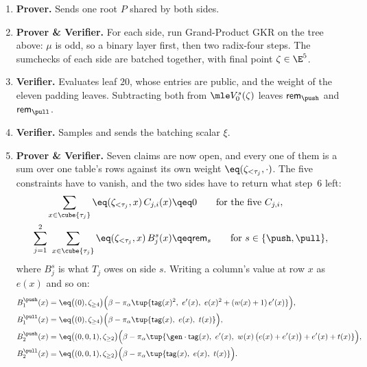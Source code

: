 \begin{enumerate}[itemsep=1pt,topsep=3pt]
\item \textbf{Prover.} Sends one root $P$ shared by both sides.
\item \textbf{Prover \& Verifier.} For each side, run Grand-Product GKR on the tree above: $\mu$ is odd, so a binary layer first, then two radix-four steps. The sumchecks of each side are batched together, with final point $\zeta\in\E^{5}$.
\item \textbf{Verifier.} Evaluates leaf $20$, whose entries are public, and the weight of the eleven padding leaves. Subtracting both from $\mle V^{s}_0(\zeta)$ leaves $\mathsf{rem}_{\push}$ and $\mathsf{rem}_{\pull}$.
\item \textbf{Verifier.} Samples and sends the batching scalar $\xi$.
\item \textbf{Prover \& Verifier.} Seven claims are now open, and every one of them is a sum over one table's rows against its own weight $\eq(\zeta_{<\tau_j},\cdot)$. The five constraints have to vanish, and the two sides have to return what step~6 left:
\begin{align*}
  \sum_{x\in\cube{\tau_j}}\eq(\zeta_{<\tau_j},x)\,C_{j,i}(x)&\qeq0 \qquad\text{for the five } C_{j,i},\\
  \sum_{j=1}^{2}\ \sum_{x\in\cube{\tau_j}}\eq(\zeta_{<\tau_j},x)\,B^{s}_{j}(x)&\qeq\mathsf{rem}_{s} \qquad\text{for } s\in\{\push,\pull\},
\end{align*}
where $B^{s}_{j}$ is what $T_j$ owes on side $s$. Writing a column's value at row $x$ as $e(x)$ and so on:
\begin{align*}
  B^{\push}_{1}(x)&=\eq\bigl((0),\zeta_{\ge4}\bigr)\Bigl(\beta-\pi_\alpha\tup{\mathsf{tag}(x)^{2},\ e'(x),\ e(x)^{2}+(w(x)+1)\,e'(x)}\Bigr),\\
  B^{\pull}_{1}(x)&=\eq\bigl((0),\zeta_{\ge4}\bigr)\Bigl(\beta-\pi_\alpha\tup{\mathsf{tag}(x),\ e(x),\ t(x)}\Bigr),\\
  B^{\push}_{2}(x)&=\eq\bigl((0,0,1),\zeta_{\ge2}\bigr)\Bigl(\beta-\pi_\alpha\tup{\gen\cdot\mathsf{tag}(x),\ e'(x),\ w(x)\,\bigl(e(x)+e'(x)\bigr)+e'(x)+t(x)}\Bigr),\\
  B^{\pull}_{2}(x)&=\eq\bigl((0,0,1),\zeta_{\ge2}\bigr)\Bigl(\beta-\pi_\alpha\tup{\mathsf{tag}(x),\ e(x),\ t(x)}\Bigr).
\end{align*}


\end{enumerate}
